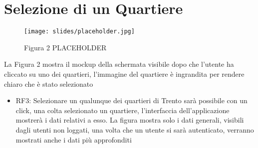 \section{Selezione di un Quartiere}

    \begin{figure}
        \texttt{[image: slides/placeholder.jpg]} %
        \caption{Figura 2 PLACEHOLDER}
    \end{figure}    

    La Figura 2 mostra il mockup della schermata visibile dopo che l'utente ha cliccato su uno dei quartieri, l'immagine del quartiere è ingrandita per rendere chiaro che è stato selezionato

    \begin{itemize}
        \item RF3: Selezionare un qualunque dei quartieri di Trento sarà possibile con un click, una colta selezionato un quartiere, l'interfaccia dell'applicazione mostrerà i dati relativi a esso. La figura mostra solo i dati generali, visibili dagli utenti non loggati, una volta che un utente si sarà autenticato, verranno mostrati anche i dati più approfonditi
    \end{itemize}


